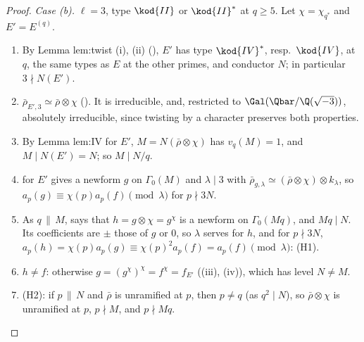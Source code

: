 \begin{proof}
\emph{Case (b).} $\ell=3$, type $\kod{II}$ or $\kod{II}^*$ at $q\ge5$. Let $\chi=\chi_{q^*}$ and $E'=E^{(q)}$.
\begin{enumerate}[label=(b\arabic*)]
\item By Lemma lem:twist (i), (ii) (), $E'$ has type $\kod{IV}^*$, resp.\ $\kod{IV}$, at $q$, the same types as $E$ at the other primes, and conductor $N$; in particular
$3\nmid N(E')$.
\item $\bar\rho_{E',3}\simeq\bar\rho\otimes\chi$ (). It is irreducible, and, restricted to $\Gal(\Qbar/\Q(\sqrt{-3}))$, absolutely irreducible, since twisting by a character
preserves both properties.
\item By Lemma lem:IV for $E'$, $M=N(\bar\rho\otimes\chi)$ has $v_q(M)=1$, and $M\mid N(E')=N$; so $M\mid N/q$.
\item {} for $E'$ gives a newform $g$ on $\Gamma_0(M)$ and $\lambda\mid3$ with $\bar\rho_{g,\lambda}\simeq(\bar\rho\otimes\chi)\otimes k_\lambda$, so $a_p(g)\equiv\chi(p)a_p(f)\pmod\lambda$ for
$p\nmid3N$.
\item As $q\,\|\,M$,  says that $h=g\otimes\chi=g^\chi$ is a newform on $\Gamma_0(Mq)$, and $Mq\mid N$. Its coefficients are $\pm$ those of $g$ or $0$, so $\lambda$
serves for $h$, and for $p\nmid3N$, $a_p(h)=\chi(p)a_p(g)\equiv\chi(p)^2a_p(f)=a_p(f)\pmod\lambda$: (H1).
\item $h\ne f$: otherwise $g=(g^\chi)^\chi=f^\chi=f_{E'}$ ((iii), (iv)), which has level $N\ne M$.
\item (H2): if $p\,\|\,N$ and $\bar\rho$ is unramified at $p$, then $p\ne q$ (as $q^2\mid N$), so $\bar\rho\otimes\chi$ is unramified at $p$, $p\nmid M$, and $p\nmid Mq$.
\end{enumerate}


\end{proof}
